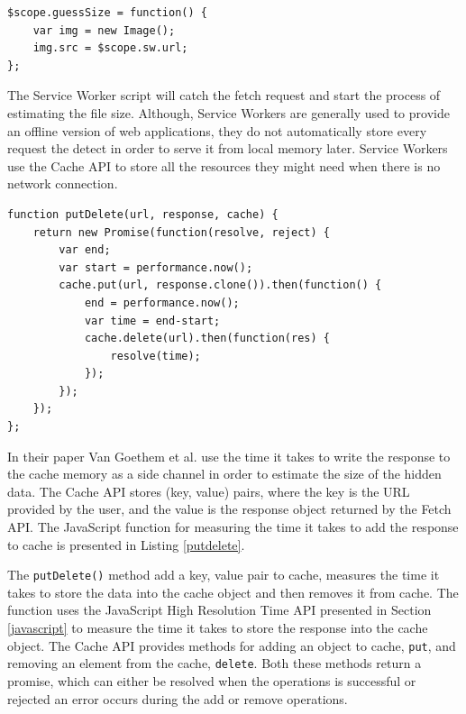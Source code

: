 \documentclass[10pt,a4paper,twoside]{book}
\begin{document}
\begin{lstlisting}[caption={Loading file as an Image},label={SWimg}]
$scope.guessSize = function() {
	var img = new Image();
	img.src = $scope.sw.url;
};
\end{lstlisting}

The Service Worker script will catch the fetch request and start the process of estimating the file size. Although, Service Workers are generally used to provide an offline version of web applications, they do not automatically store every request the detect in order to serve it from local memory later. Service Workers use the Cache API \cite{cacheAPI} to store all the resources they might need when there is no network connection.

\begin{lstlisting}[caption={JavaScript code for measuring the time it takes to write to cache.},label={putdelete}]
function putDelete(url, response, cache) {
    return new Promise(function(resolve, reject) {
        var end;
        var start = performance.now();
        cache.put(url, response.clone()).then(function() {
            end = performance.now();
            var time = end-start;
            cache.delete(url).then(function(res) {
                resolve(time);
            });
        });
    });
};
\end{lstlisting}

In their paper Van Goethem et al. \cite{van2015clock} use the time it takes to write the response to the cache memory as a side channel in order to estimate the size of the hidden data. The Cache API stores (key, value) pairs, where the key is the URL provided by the user, and the value is the response object returned by the Fetch API. The JavaScript function for measuring the time it takes to add the response to cache is presented in Listing \ref{putdelete}. 

The \texttt{putDelete()} method add a key, value pair to cache, measures the time it takes to store the data into the cache object and then removes it from cache. The function uses the JavaScript High Resolution Time API presented in Section \ref{javascript} to measure the time it takes to store the response into the cache object. The Cache API provides methods for adding an object to cache, \texttt{put}, and removing an element from the cache, \texttt{delete}. Both these methods return a promise, which can either be resolved when the operations is successful or rejected an error occurs during the add or remove operations.  
\end{document}

